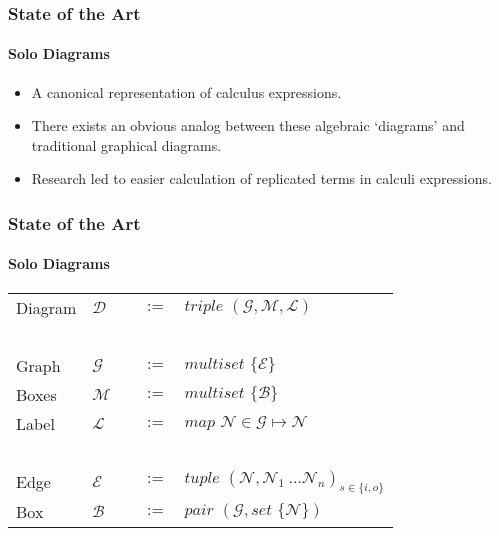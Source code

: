 \documentclass{beamer}
\begin{document}
 
    \begin{frame}
        \frametitle{State of the Art}
        \framesubtitle{Solo Diagrams}
        \begin{itemize}
            \item A canonical representation of calculus expressions.
            \item There exists an obvious analog between these algebraic `diagrams' and traditional graphical diagrams.
            \item Research led to easier calculation of replicated terms in calculi expressions.
        \end{itemize}
    \end{frame}

    \begin{frame}
        \frametitle{State of the Art}
        \framesubtitle{Solo Diagrams}
            \begin{tabular}{ l l l }
                Diagram & $\mathcal{D} \quad$ & $:= \quad triple \,\, (\mathcal{G}, \mathcal{M}, \mathcal{L})$ \\~\\

                Graph   & $\mathcal{G} \quad$ & $:= \quad multiset \,\, \{\mathcal{E}\}$ \\
                Boxes   & $\mathcal{M} \quad$ & $:= \quad multiset \,\, \{\mathcal{B}\}$ \\
                Label   & $\mathcal{L} \quad$ & $:= \quad map \,\, \mathcal{N} \in \mathcal{G} \mapsto \mathcal{N}$ \\~\\

                Edge    & $\mathcal{E} \quad$ & $:= \quad tuple \,\, (\mathcal{N}, \mathcal{N}_1~\ldots \mathcal{N}_n)_{s \in \{i, o\}}$ \\
                Box     & $\mathcal{B} \quad$ & $:= \quad pair \,\, (\mathcal{G}, set \,\, \{\mathcal{N}\})$
            \end{tabular}
    \end{frame}
    
\end{document}
